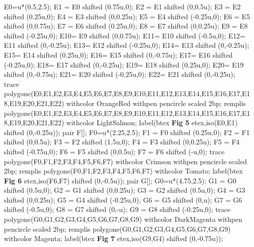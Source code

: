 \begin{corrige}
{\begin{Geometrie}[CoinHD={(8u,8u)}]
            E0=u*(0.5,2.5);
            E1 = E0  shifted (0.75u,0);
            E2 = E1  shifted (0,0.5u);
            E3 = E2  shifted (0.25u,0);
            E4 = E3  shifted (0,0.25u);
            E5 = E4  shifted (-0.25u,0);
            E6 = E5  shifted (0,0.75u);
            E7 = E6  shifted (0.25u,0);
            E8 = E7  shifted (0,0.25u);
            E9 = E8  shifted (-0.25u,0);
            E10= E9  shifted (0,0.75u);%
            E11= E10 shifted (-0.5u,0);
            E12= E11  shifted (0,-0.25u);
            E13= E12  shifted (-0.25u,0);
            E14= E13  shifted (0,-0.25u);
            E15= E14  shifted (0.25u,0);
            E16= E15  shifted (0,-0.75u);
            E17= E16  shifted (-0.25u,0);
            E18= E17  shifted (0,-0.25u);
            E19= E18  shifted (0.25u,0);
            E20= E19 shifted (0,-0.75u);
            E21= E20  shifted (-0.25u,0);
            E22= E21 shifted (0,-0.25u);
            trace   polygone(E0,E1,E2,E3,E4,E5,E6,E7,E8,E9,E10,E11,E12,E13,E14,E15,E16,E17,E18,E19,E20,E21,E22) withcolor OrangeRed withpen pencircle scaled 2bp;
            remplis polygone(E0,E1,E2,E3,E4,E5,E6,E7,E8,E9,E10,E11,E12,E13,E14,E15,E16,E17,E18,E19,E20,E21,E22) withcolor LightSalmon;            
            label(btex {\bfseries Fig 5} etex,iso(E0,E1) shifted (0,-0.25u));
            pair F[];
            F0=u*(2.25,2.5);
            F1 = F0  shifted (0.25u,0);
            F2 = F1  shifted (0,0.5u);
            F3 = F2  shifted (1.5u,0);
            F4 = F3  shifted (0,0.25u);
            F5 = F4  shifted (-0.75u,0);
            F6 = F5  shifted (0,0.5u);
            F7 = F6  shifted (-u,0);
            trace   polygone(F0,F1,F2,F3,F4,F5,F6,F7) withcolor Crimson withpen pencircle scaled 2bp;
            remplis polygone(F0,F1,F2,F3,F4,F5,F6,F7) withcolor Tomato;            
            label(btex {\bfseries Fig 6} etex,iso(F6,F7) shifted (0,-0.5u));
            pair G[];
            G0=u*(4.75,2.5);
            G1 = G0  shifted (0.5u,0);
            G2 = G1  shifted (0,0.25u);
            G3 = G2  shifted (0.5u,0);
            G4 = G3  shifted (0,0.25u);
            G5 = G4  shifted (-0.25u,0);
            G6 = G5  shifted (0,u);
            G7 = G6  shifted (-0.5u,0);
            G8 = G7  shifted (0,-u);
            G9 = G8  shifted (-0.25u,0);
            trace   polygone(G0,G1,G2,G3,G4,G5,G6,G7,G8,G9) withcolor DarkMagenta withpen pencircle scaled 2bp;
            remplis polygone(G0,G1,G2,G3,G4,G5,G6,G7,G8,G9) withcolor Magenta;
            label(btex {\bfseries Fig 7} etex,iso(G9,G4) shifted (0,-0.75u));

\end{Geometrie}}
\end{corrige}
